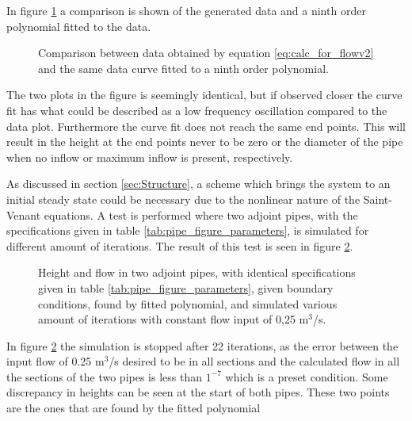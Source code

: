 In figure \ref{fig:curvefit_comparision} a comparison is shown of the generated data and a ninth order polynomial fitted to the data.

\begin{figure}[H]
 \centering
 
\caption{Comparison between data obtained by equation \ref{eq:calc_for_flowv2} and the same data curve fitted to a ninth order polynomial.}
\label{fig:curvefit_comparision}
\end{figure}

The two plots in the figure is seemingly identical, but if observed closer the curve fit has what could be described as a low frequency oscillation compared to the data plot. Furthermore the curve fit does not reach the same end points. This will result in the height at the end points never to be zero or the diameter of the pipe when no inflow or maximum inflow is present, respectively. 

 As discussed in section \ref{sec:Structure}, a scheme which brings the system to an initial steady state could be necessary due to the nonlinear nature of the Saint-Venant equations. A test is performed where two adjoint pipes, with the specifications given in table \ref{tab:pipe_figure_parameters}, is simulated for different amount of iterations. The result of this test is seen in figure \ref{fig:two_pipes_init_steady_state}. 

\begin{figure}[H]
 \centering
 
\caption{Height and flow in two adjoint pipes, with identical specifications given in table \ref{tab:pipe_figure_parameters}, given boundary conditions, found by fitted polynomial, and simulated various amount of iterations with constant flow input of 0,25 $\text{m}^\text{3}$/s.}
\label{fig:two_pipes_init_steady_state}
\end{figure}

In figure \ref{fig:two_pipes_init_steady_state} the simulation is stopped after 22 iterations, as the error between the input flow of 0.25 $\text{m}^\text{3}$/s desired to be in all sections and the calculated flow in all the sections of the two pipes is less than $1^{-7}$ which is a preset condition. Some discrepancy in heights can be seen at the start of both pipes. These two points are the ones that are found by the fitted polynomial 
